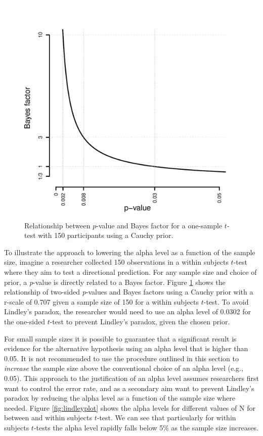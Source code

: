 \documentclass[
  english,
  ,jou, a4paper,floatsintext]{apa6}
\begin{document}
\begin{figure}
\centering
\includegraphics{Justify_in_Practice_files/figure-latex/Lindley150-1.pdf}
\caption{\label{fig:Lindley150}Relationship between \(p\)-value and Bayes factor for a one-sample \(t\)-test with 150 participants using a Cauchy prior.}
\end{figure}

To illustrate the approach to lowering the alpha level as a function of the sample size, imagine a researcher collected 150 observations in a within subjects \(t\)-test where they aim to test a directional prediction. For any sample size and choice of prior, a \emph{p}-value is directly related to a Bayes factor. Figure \ref{fig:Lindley150} shows the relationship of two-sided \emph{p}-values and Bayes factors using a Cauchy prior with a r-scale of 0.707 given a sample size of 150 for a within subjects \(t\)-test. To avoid Lindley's paradox, the researcher would need to use an alpha level of 0.0302 for the one-sided \(t\)-test to prevent Lindley's paradox, given the chosen prior.

For small sample sizes it is possible to guarantee that a significant result is evidence for the alternative hypothesis using an alpha level that is higher than 0.05. It is not recommended to use the procedure outlined in this section to \emph{increase} the sample size above the conventional choice of an alpha level (e.g., 0.05). This approach to the justification of an alpha level assumes researchers first want to control the error rate, and as a secondary aim want to prevent Lindley's paradox by reducing the alpha level as a function of the sample size where needed. Figure \ref{fig:lindleyplot} shows the alpha levels for different values of N for between and within subjects \(t\)-test. We can see that particularly for within subjects \(t\)-tests the alpha level rapidly falls below 5\% as the sample size increases.
\end{document}
